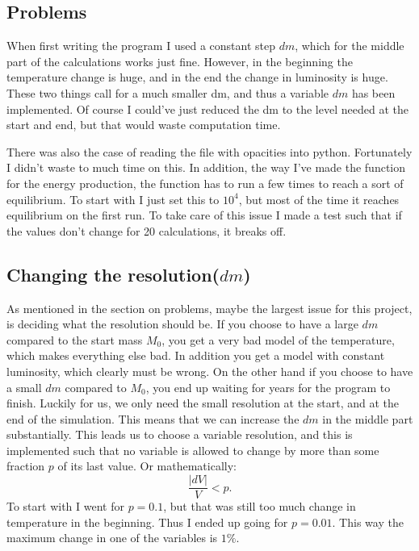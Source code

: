 \documentclass[a4paper,12pt]{article}
\begin{document}
\subsection{Problems}
When first writing the program I used a constant step $dm$, which for the middle part of the calculations works just fine. However, in the beginning the temperature change is huge, and in the end the change in luminosity is huge. These two things call for a much smaller dm, and thus a variable $dm$ has been implemented. Of course I could've just reduced the dm to the level needed at the start and end, but that would waste computation time.

There was also the case of reading the file with opacities into python. Fortunately I didn't waste to much time on this.
In addition, the way I've made the function for the energy production, the function has to run a few times to reach a sort of equilibrium. To start with I just set this to $10^4$, but most of the time it reaches equilibrium on the first run. To take care of this issue I made a test such that if the values don't change for 20 calculations, it breaks off.



\subsection{Changing the resolution($dm$)}
As mentioned in the section on problems, maybe the largest issue for this project, is deciding what the resolution should be. 
If you choose to have a large $dm$ compared to the start mass $M_0$, you get a very bad model of the temperature, which makes everything else bad. 
In addition you get a model with constant luminosity, which clearly must be wrong. 
On the other hand if you choose to have a small $dm$ compared to $M_0$, you end up waiting for years for the program to finish. 
Luckily for us, we only need the small resolution at the start, and at the end of the simulation. 
This means that we can increase the $dm$ in the middle part substantially. 
This leads us to choose a variable resolution, and this is implemented such that no variable is allowed to change by more than some fraction $p$ of its last value. 
Or mathematically:
\begin{equation}
 \frac{|dV|}{V} < p.
\end{equation}
To start with I went for $p = 0.1$, but that was still too much change in temperature in the beginning. 
Thus I ended up going for $p = 0.01$. 
This way the maximum change in one of the variables is $1 \%$.
\end{document}
